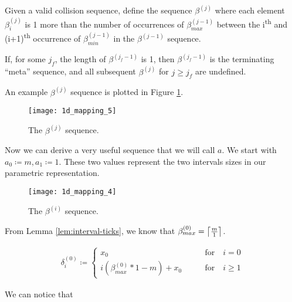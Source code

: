 \begin{definition}
	Given a valid collision sequence, define the sequence $\beta^{(j)}$ where each element $\beta^{(j)}_i$ is 1 more than the number of occurrences of $\beta^{(j-1)}_{max}$ between the i\textsuperscript{th} and (i+1)\textsuperscript{th} occurrence of $\beta^{(j-1)}_{min}$ in the $\beta^{(j-1)}$ sequence.

	If, for some $j_f$, the length of $\beta^{(j_f-1)}$ is 1, then $\beta^{(j_f-1)}$ is the terminating ``meta'' sequence, and all subsequent $\beta^{(j)}$ for $j \ge j_f$ are undefined.
\end{definition}

An example $\beta^{(j)}$ sequence is plotted in Figure \ref{fig:beta-sequence-j}.

\begin{figure}[H]
  \begin{center}
    \texttt{[image: 1d\_mapping\_5]}
  \end{center}
  \vspace{-.2in} %
  \caption{\label{fig:beta-sequence-j} The $\beta^{(j)}$ sequence.}
\end{figure}

Now we can derive a very useful sequence that we will call $a$. We start with $a_0 \coloneqq m, a_1 \coloneqq 1$. These two values represent the two intervals sizes in our parametric representation.

\begin{figure}[H]
  \begin{center}
    \texttt{[image: 1d\_mapping\_4]}
  \end{center}
  \vspace{-.2in} %
  \caption{\label{fig:a-sequence} The $\beta^{(i)}$ sequence.}
\end{figure}

From Lemma \ref{lem:interval-ticks}, we know that $\beta^{(0)}_{max} = \ceil{\frac{m}{1}}$. 

\begin{align}\label{delta_beta}
	\delta^{(0)}_i \coloneqq \begin{cases}
		x_0 \qquad &\text{for} \quad i = 0\\
		i (\beta^{(0)}_{max} * 1 - m) + x_0 \qquad &\text{for} \quad i \ge 1
	\end{cases}
\end{align}

We can notice that

